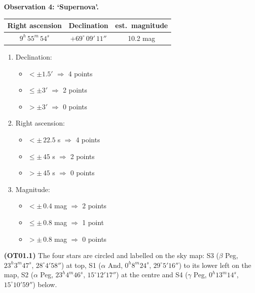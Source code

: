 \medskip
\textbf{Observation 4: `Supernova'.}

\begin{center}
\begin{tabular}{c|c|c}
Right ascension & Declination & est.\ magnitude \\
\hline
$9^h\,55^m\,54^s$ & $+69^\circ\,09'\,11''$ & 10.2 mag \\
\end{tabular}
\end{center}

\begin{enumerate}
\item Declination:
  \begin{itemize}
  \item[(a)] $< \pm 1.5'$ $\Longrightarrow$ 4 points
  \item[(b)] $\le \pm 3'$ $\Longrightarrow$ 2 points
  \item[(c)] $> \pm 3'$ $\Longrightarrow$ 0 points
  \end{itemize}
\item Right ascension:
  \begin{itemize}
  \item[(a)] $< \pm\,22.5$ s $\Longrightarrow$ 4 points
  \item[(b)] $\le \pm\,45$ s $\Longrightarrow$ 2 points
  \item[(c)] $> \pm\,45$ s $\Longrightarrow$ 0 points
  \end{itemize}
\item Magnitude:
  \begin{itemize}
  \item[(a)] $< \pm\,0.4$ mag $\Longrightarrow$ 2 points
  \item[(b)] $\le \pm\,0.8$ mag $\Longrightarrow$ 1 point
  \item[(c)] $> \pm\,0.8$ mag $\Longrightarrow$ 0 points
  \end{itemize}
\end{enumerate}

\textbf{(OT01.1)} The four stars are circled and labelled on the sky map:
S3 ($\beta$ Peg, $23^h3^m47^s$, $28^\circ4'58''$) at top, S1 ($\alpha$ And,
$0^h8^m24^s$, $29^\circ5'16''$) to its lower left on the map, S2
($\alpha$ Peg, $23^h4^m46^s$, $15^\circ12'17''$) at the centre and S4
($\gamma$ Peg, $0^h13^m14^s$, $15^\circ10'59''$) below.


